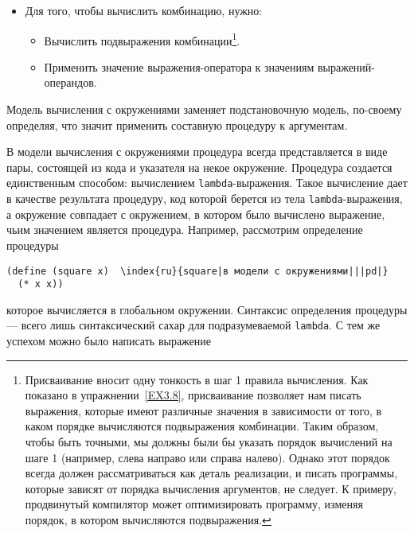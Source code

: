 \begin{itemize}%
\samepage
\item
Для того, чтобы вычислить комбинацию,
нужно:
\begin{itemize}
\samepage
\item
\nopagebreak
Вычислить подвыражения комбинации\footnote{Присваивание вносит одну тонкость в шаг 1
правила вычисления.  Как показано в
упражнении~\ref{EX3.8}, присваивание позволяет нам писать выражения,
которые имеют различные значения в зависимости от того, в каком
порядке вычисляются подвыражения комбинации.  Таким образом, чтобы
быть точными, мы должны были бы указать порядок вычислений на шаге 1
(например, слева направо или справа налево).  Однако этот порядок
всегда должен рассматриваться как деталь реализации, и писать
программы, которые зависят от порядка вычисления аргументов, не
следует.  К примеру, продвинутый компилятор может оптимизировать
программу, изменяя порядок, в котором вычисляются подвыражения.
}.

\item
Применить значение выражения-оператора к
значениям вы\-ра\-же\-ний-операндов.
\end{itemize}
\end{itemize}%
Модель вычисления с окружениями заменяет подстановочную модель,
по-своему определяя, что значит применить составную процедуру к
аргументам.

В модели вычисления с окружениями процедура всегда
представляется в виде пары, состоящей из кода и указателя на некое
окружение.   Процедура создается единственным способом: вычислением
{\tt lambda}-выражения.  Такое вычисление дает в качестве
результата процедуру, код которой берется из тела
{\tt lambda}-выражения, а окружение совпадает с окружением, в
котором было вычислено выражение, чьим значением является
процедура.  Например, рассмотрим определение процедуры

\begin{Verbatim}[fontsize=\small]
(define (square x)  \index{ru}{square|в модели с окружениями|||pd|}
  (* x x))
\end{Verbatim}
которое вычисляется в глобальном окружении.  Синтаксис определения
процедуры --- всего лишь синтаксический сахар для подразумеваемой
{\tt lambda}.  С тем же успехом можно было написать
выражение

